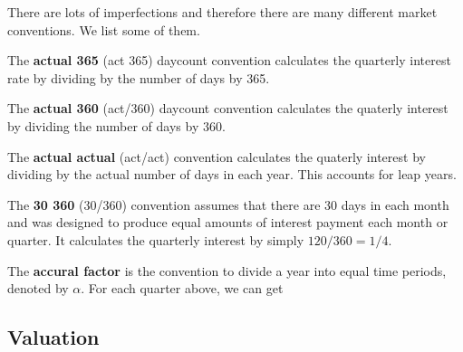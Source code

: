 \documentclass{article}
\begin{document}
      There are lots of imperfections and therefore there are many different market conventions. We list some of them. 

      \begin{definition}[Act/365]
        The \textbf{actual 365} (act 365) daycount convention calculates the quarterly interest rate by dividing by the number of days by 365. 
      \end{definition}

      \begin{definition}[Act/360]
        The \textbf{actual 360} (act/360) daycount convention calculates the quaterly interest by dividing the number of days by 360. 
      \end{definition}

      \begin{definition}
        The \textbf{actual actual} (act/act) convention calculates the quaterly interest by dividing by the actual number of days in each year. This accounts for leap years. 
      \end{definition}    

      \begin{definition}[30/360]
        The \textbf{30 360} (30/360) convention assumes that there are 30 days in each month and was designed to produce equal amounts of interest payment each month or quarter. It calculates the quarterly interest by simply $120/360 = 1/4$.
      \end{definition}

      \begin{example}
        The \textbf{accural factor} is the convention to divide a year into equal time periods, denoted by $\alpha$. For each quarter above, we can get 
      \end{example}

  \subsection{Valuation}
\end{document}
